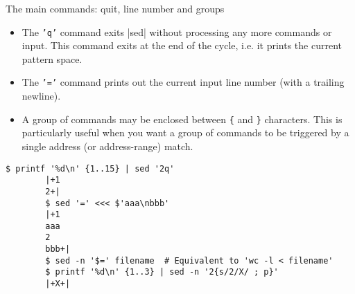 \begin{frame}[fragile]{The main commands: quit, line number and groups}
    \vspace{-3mm}
    \begin{itemize}
        \item The \texttt{'q'} command exits \bash|sed| without processing any more commands or input.
              This command exits at the end of the cycle, i.e. it prints the current pattern space.
        \item The \texttt{'='} command prints out the current input line number (with a trailing newline).
        \item A group of commands may be enclosed between \texttt{\{} and \texttt{\}} characters.
              This is particularly useful when you want a group of commands to be triggered by a single address (or address-range) match.
    \end{itemize}
    \begin{lstlisting}[style=MyBash]
        $ printf '%d\n' {1..15} | sed '2q'
        |+1
        2+|
        $ sed '=' <<< $'aaa\nbbb'
        |+1
        aaa
        2
        bbb+|
        $ sed -n '$=' filename  # Equivalent to 'wc -l < filename'
        $ printf '%d\n' {1..3} | sed -n '2{s/2/X/ ; p}'
        |+X+|
    \end{lstlisting}
\end{frame}




